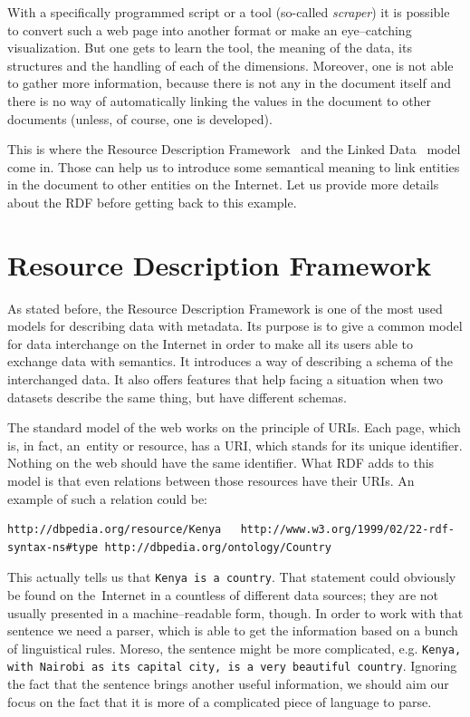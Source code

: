With a specifically programmed script or a tool (so-called \emph{scraper}) it is possible to
convert such a web page into another format or make an eye--catching visualization.
But one gets to learn the tool, the meaning of the data, its structures and the 
handling of each of the dimensions. Moreover, one is not able to gather more information,
because there is not any in the document itself and there is no way of
automatically linking the values in the document to other documents (unless, of course,
one is developed).

This is where the Resource Description Framework~\cite{rdf} and the Linked Data~\cite{ld}
model come in. Those
can help us to introduce some semantical meaning to link entities in the document to
other entities on the Internet. Let us provide more details about the RDF before getting
back to this example.

\section{Resource Description Framework}
As stated before, the Resource Description Framework is one of the most used models for
describing data with metadata. Its purpose is to give a common model for data interchange
on the Internet in order to make all its users able to exchange data with semantics.
It introduces a way of describing a schema of the interchanged data. It also 
offers features that help facing a situation when two datasets describe the same thing,
but have different schemas.

The standard model of the web works on the principle of URIs. Each page, which is, in fact,
an~entity or resource, has a URI, which stands for its unique identifier. Nothing on the web
should have the same identifier. What RDF adds to this model is that even relations
between those resources have their URIs. An example of such a relation could be:

\tiny\begin{verbatim}
http://dbpedia.org/resource/Kenya   http://www.w3.org/1999/02/22-rdf-syntax-ns#type http://dbpedia.org/ontology/Country  
\end{verbatim}\normalsize

This actually tells us that \texttt{Kenya is a country}. That statement could obviously be found on
the~Internet in a countless of different data sources; they are not usually presented
in a machine--readable form, though. In order to work with that sentence we need a 
parser, which is able to get the information based on a bunch of linguistical rules.
Moreso, the sentence might be more complicated, e.g. \texttt{Kenya, with Nairobi as its capital city,
is a very beautiful country}. Ignoring the fact that the sentence brings another useful
information, we should aim our focus on the fact that it is more of a complicated piece of language to parse. 

